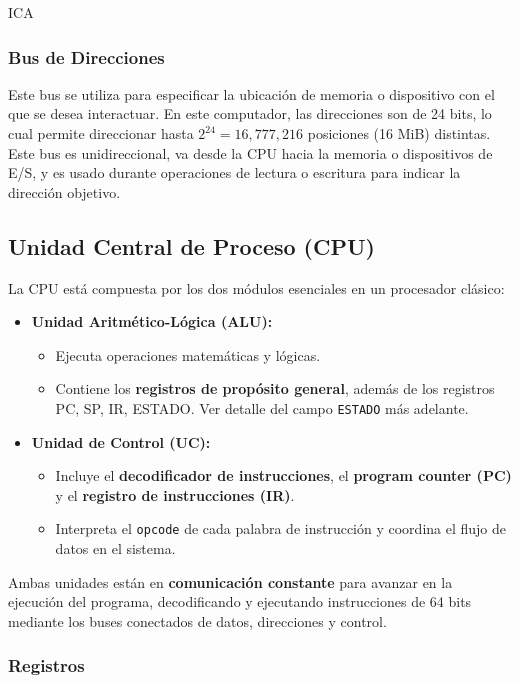 ICA\documentclass{article}
\begin{document}
\subsubsection*{Bus de Direcciones}

Este bus se utiliza para especificar la ubicación de memoria o
dispositivo con el que se desea interactuar. En este computador, las
direcciones son de 24 bits, lo cual permite direccionar hasta
$2^{24} = 16,\!777,\!216$ posiciones (16 MiB) distintas.
Este bus es unidireccional, va desde la CPU hacia la memoria o
dispositivos de E/S, y es usado durante operaciones de lectura o
escritura para indicar la dirección objetivo.


\subsection{Unidad Central de Proceso (CPU)}

La CPU está compuesta por los dos módulos esenciales en un procesador clásico:

\begin{itemize}
  \item \textbf{Unidad Aritmético-Lógica (ALU):}
        \begin{itemize}
          \item Ejecuta operaciones matemáticas y lógicas.
          \item Contiene los \textbf{registros de propósito general}, además de los registros PC, SP, IR, ESTADO. Ver detalle del campo \texttt{ESTADO} más adelante.
        \end{itemize}
  \item \textbf{Unidad de Control (UC):}
        \begin{itemize}
          \item Incluye el \textbf{decodificador de instrucciones}, el \textbf{program counter (PC)} y el \textbf{registro de instrucciones (IR)}.
          \item Interpreta el \texttt{opcode} de cada palabra de instrucción y coordina el flujo de datos en el sistema.
        \end{itemize}
\end{itemize}

Ambas unidades están en \textbf{comunicación constante} para avanzar en la ejecución del programa, decodificando y ejecutando instrucciones de 64 bits mediante los buses conectados de datos, direcciones y control.

\subsubsection{Registros}
\end{document}
